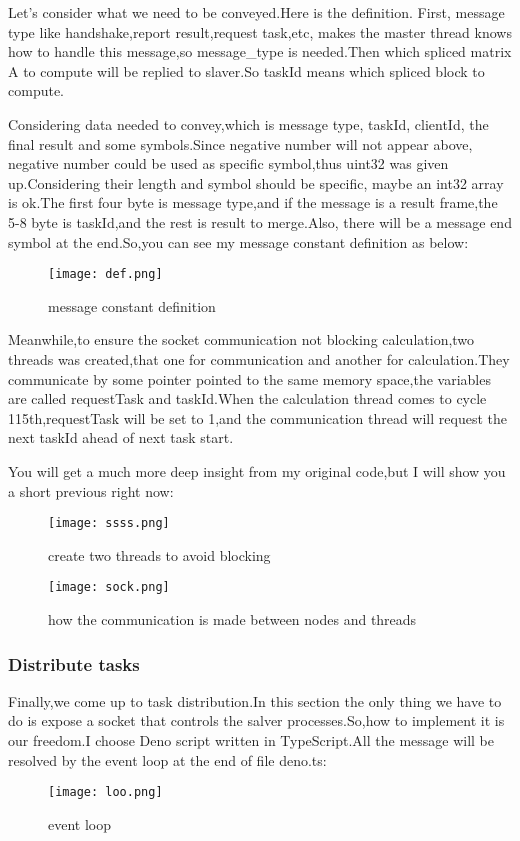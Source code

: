 \documentclass[12pt]{scrartcl} %
\begin{document}
Let's consider what we need to be conveyed.Here is the definition. First, message type like handshake,report result,request task,etc, makes the master thread knows how to handle this message,so message\_type is needed.Then which spliced matrix A to compute will be replied to slaver.So taskId means which spliced block to compute.

Considering data needed to convey,which is message type, taskId, clientId, the final result and some symbols.Since negative number will not appear above, negative number could be used as specific symbol,thus uint32 was given up.Considering their length and symbol should be specific, maybe an int32 array is ok.The first four byte is message type,and if the message is a result frame,the 5-8 byte is taskId,and the rest is result to merge.Also, there will be a message end symbol at the end.So,you can see my message constant definition as below:
\begin{figure}[H]
    \centering
    \texttt{[image: def.png]}
    \caption{message constant definition}
    \label{}
\end{figure}

Meanwhile,to ensure the socket communication not blocking calculation,two threads was created,that one for communication and another for calculation.They communicate by some pointer pointed to the same memory space,the variables are called requestTask and taskId.When the calculation thread comes to cycle 115th,requestTask will be set to 1,and the communication thread will request the next taskId ahead of next task start.

You will get a much more deep insight from my original code,but I will show you a short previous right now:
\begin{figure}[H]
    \centering
    \texttt{[image: ssss.png]}
    \caption{create two threads to avoid blocking}
    \label{}
\end{figure}
\begin{figure}[H]
    \centering
    \texttt{[image: sock.png]}
    \caption{how the communication is made between nodes and threads}
    \label{}
\end{figure}
\subsubsection{Distribute tasks}
Finally,we come up to task distribution.In this section the only thing we have to do is expose a socket that controls the salver processes.So,how to implement it is our freedom.I choose Deno script written in TypeScript.All the message will be resolved by the event loop at the end of file deno.ts:
\begin{figure}[H]
    \centering
    \texttt{[image: loo.png]}
    \caption{event loop}
    \label{}
\end{figure}
\end{document}
